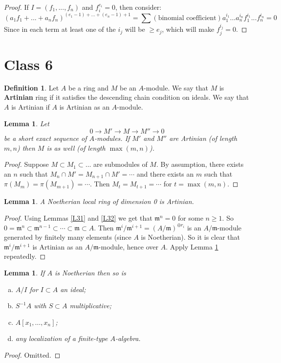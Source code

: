 \documentclass{article}
\newcommand{\fr}{\mathfrak}
\theoremstyle{plain}
\newtheorem{lem}[thm]{Lemma}
\theoremstyle{definition}
\newtheorem{defn}{Definition}
\theoremstyle{remark}
\begin{document}
\begin{proof}
If $I = (f_1, ... , f_n)$ and $f_i^{e_i} = 0$, then consider:
\[     (a_1 f_1 + ... + a_n f_n)^{(e_1 - 1) + ... + (e_n -1) + 1} = \sum (\text{binomial coefficient}) a_1^{i_1}...a_n^{i_n} f_1^{i_1}...f_n^{i_n} =0   \]
Since in each term at least one of the $i_j$ will be $\geq e_j$, which will make $f_j^{i_j} = 0$.
\end{proof}

\section*{Class 6}

\begin{defn}
Let $A$ be a ring and $M$ be an $A$-module. We say that $M$ is \textbf{Artinian} ring if it satisfies the descending chain condition on ideals. We say that $A$ is Artinian if $A$ is Artinian as an $A$-module.
\end{defn}

\begin{lem}
\label{L33}
Let
\[0\to M'\to M\to M''\to 0\]
be a short exact sequence of $A$-modules. If $M'$ and $M''$ are Artinian (of length $m,n$) then $M$ is as well (of length $\max(m,n)$).
\end{lem}
\begin{proof}
Suppose $M\subset M_1\subset\ldots$ are submodules of $M$. By assumption, there exists an $n$ such that $M_n\cap M'=M_{n+1}\cap M'=\cdots$ and there exists an $m$ such that $\pi(M_m)=\pi(M_{m+1})=\cdots$. Then $M_t=M_{t+1}=\cdots$ for $t=\max(m,n)$.
\end{proof}

\begin{lem}
\label{L34}
A Noetherian local ring of dimension 0 is Artinian.
\end{lem}
\begin{proof}
Using Lemmas \ref{L31} and \ref{L32} we get that $\fr m^n=0$ for some $n\geq 1$. So $0=\fr m^n\subset\fr m^{n-1}\subset\cdots\subset\fr m\subset A$. Then $\fr m^i/\fr m^{i+1}=(A/\fr m)^{\oplus r_i}$ is an $A/\fr m$-module generated by finitely many elements (since $A$ is Noetherian). So it is clear that $\fr m^i/\fr m^{i+1}$ is Artinian as an $A/\fr m$-module, hence over $A$. Apply Lemma \ref{L33} repeatedly.
\end{proof}

\begin{lem}
\label{L35}
If $A$ is Noetherian then so is
\begin{enumerate}[(a)]
\item $A/I$ for $I\subset A$ an ideal;
\item $S^{-1}A$ with $S\subset A$ multiplicative;
\item $A[x_1,\ldots,x_n]$;
\item any localization of a finite-type $A$-algebra.
\end{enumerate}
\end{lem}
\begin{proof}
Omitted.
\end{proof}
\end{document}
